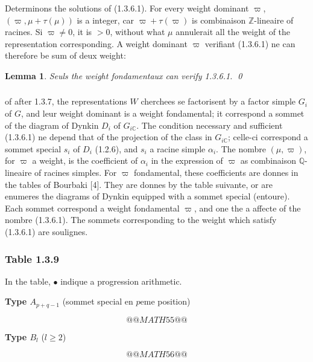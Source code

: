 \documentclass[12pt,a4paper]{article}
\theoremstyle{plain}
\newtheorem{lemma}[theorem]{Lemma}
\theoremstyle{definition}
\theoremstyle{remark}
\newcommand{\ZZ}{\mathbb{Z}}
\newcommand{\QQ}{\mathbb{Q}}
\newcommand{\CC}{\mathbb{C}}
\begin{document}
Determinons the solutions of (1.3.6.1). For every weight dominant $\varpi$, $(\varpi, \mu + \tau(\mu))$ is a integer, car $\varpi + \tau(\varpi)$ is combinaison $\ZZ$-lineaire of racines. Si $\varpi \neq 0$, it is $> 0$, without what $\mu$ annulerait all the weight of the representation corresponding. A weight dominant $\varpi$ verifiant (1.3.6.1) ne can therefore be sum of deux weight:

\begin{lemma}
Seuls the weight fondamentaux can verify \textup{1.3.6.1}.
\qed
\end{lemma}

\subsubsection{}

of after 1.3.7, the representations $W$ cherchees se factorisent by a factor simple $G_i$ of $G$, and leur weight dominant is a weight fondamental; it correspond a sommet of the diagram of Dynkin $D_i$ of $G_{i\CC}$. The condition necessary and sufficient (1.3.6.1) ne depend that of the projection of the class in $G_{i\CC}$; celle-ci correspond a sommet special $s_i$ of $D_i$ (1.2.6), and $s_i$ a racine simple $\alpha_i$. The nombre $(\mu,\varpi)$, for $\varpi$ a weight, is the coefficient of $\alpha_i$ in the expression of $\varpi$ as combinaison $\QQ$-lineaire of racines simples. For $\varpi$ fondamental, these coefficients are donnes in the tables of Bourbaki [4]. They are donnes by the table suivante, or are enumeres the diagrams of Dynkin equipped with a sommet special (entoure). Each sommet correspond a weight fondamental $\varpi$, and one the a affecte of the nombre (1.3.6.1). The sommets corresponding to the weight which satisfy (1.3.6.1) are soulignes.

\subsubsection*{Table 1.3.9}

In the table, $\bullet$ indique a progression arithmetic.

\begin{center}
\textbf{Type $A_{p+q-1}$} (sommet special en $p$eme position)
\end{center}
\[
@@MATH55@@
\]

\begin{center}
\textbf{Type $B_l$} ($l \ge 2$)
\end{center}
\[
@@MATH56@@
\]
\end{document}
